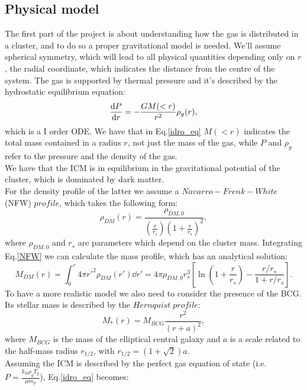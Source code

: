 \documentclass{article}
\begin{document}
\subsection{Physical model}
The first part of the project is about understanding how the gas is distributed in a cluster, and to do so a proper gravitational model is needed.
We'll assume spherical symmetry, which will lead to all physical quantities depending only on $r$, the radial coordinate, which indicates the distance from the centre of the system.
The gas is supported by thermal pressure and it's described by the hydrostatic equilibrium equation:
\begin{equation}\label{idro_eq}
	\derivative{P}{r}=-\frac{GM(<r)}{r^{2}}\rho_{g}(r),
\end{equation}
which is a I order ODE. We have that in Eq.\eqref{idro_eq} $M(<r)$ indicates the total mass contained in a radius $r$, not just the mass of the gas, while $P$ and $\rho_{g}$ refer to the pressure and the density of the gas. \\
We have that the ICM is in equilibrium in the gravitational potential of the cluster, which is dominated by dark matter. \\
For the density profile of the latter we assume a $Navarro-Frenk-White$ (NFW) $profile$, which takes the following form:
\begin{equation}\label{NFW}
	\rho_{DM}(r)=\frac{\rho_{DM,0}}{\left(\frac{r}{r_{s}}\right)\left(1+\frac{r}{r_{s}}\right)^{2}},
\end{equation}
where $\rho_{DM,0}$ and $r_{s}$ are parameters which depend on the cluster mass. 
Integrating Eq.\eqref{NFW} we can calculate the mass profile, which has an analytical solution:
\begin{equation}\label{massDM}
	M_{DM}(r)=\int_{0}^{r}4\pi r'^{2}\rho_{DM}(r')\dd{r'}=4\pi\rho_{DM,0}r_{s}^{3}\left[\ln\left(1+\frac{r}{r_{s}}\right)-\frac{r/r_{s}}{1+r/r_{s}}\right].
\end{equation}
To have a more realistic model we also need to consider the presence of the BCG. Its stellar mass is described by the $Hernquist\; profile$:
\begin{equation}\label{Hern}
	M_{*}(r)=M_{BCG}\frac{r^{2}}{(r+a)^{2}},
\end{equation}
where $M_{BCG}$ is the mass of the elliptical central galaxy and $a$ is a scale related to the half-mass radius $r_{1/2}$, with $r_{1/2}=(1+\sqrt{2})a$.\\
Assuming the ICM is described by the perfect gas equation of state (i.e. $P=\frac{k_{B}\rho_{g}T_{g}}{\mu m_{p}}$), Eq.\eqref{idro_eq} becomes:
\end{document}
